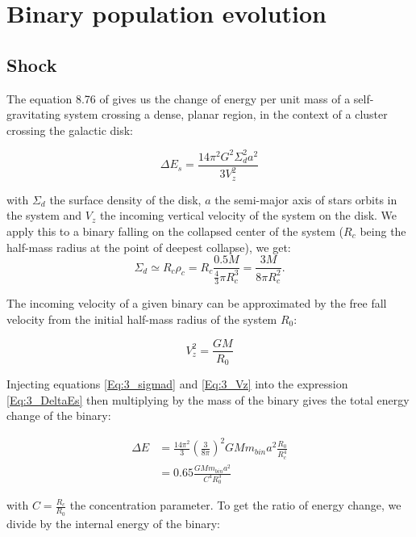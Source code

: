 
\chapter{Binary population evolution} 
\label{Chapterbinaries}

\newpage
\section{Shock}


The equation 8.76 of \cite{BT} gives us the change of energy per unit mass of a self-gravitating system crossing a dense, planar region, in the context of a cluster crossing the galactic disk:

\begin{equation}
\label{Eq:3_DeltaEs}
\Delta E_s = \frac{14 \pi^2 G^2 \Sigma^2_d a^2}{3 V_z^2}
\end{equation}

with $\Sigma_d$ the surface density of the disk, $a$ the semi-major axis of stars orbits in the system and $V_z$ the incoming vertical velocity of the system on the disk. We apply this to a binary falling on the collapsed center of the system ($R_c$ being the half-mass radius at the point of deepest collapse), we get:
\begin{equation}
\label{Eq:3_sigmad}
\Sigma_d \simeq R_c \rho_c = R_c \frac{0.5 M}{\frac{4}{3} \pi R^3_c} = \frac{3 M}{8 \pi R_c^2}.
\end{equation}

The incoming velocity of a given binary can be approximated by the free fall velocity from the initial half-mass radius of the system $R_0$:

\begin{equation}
\label{Eq:3_Vz}
V_z^2 = \frac{G M}{R_0}
\end{equation}

Injecting equations \ref{Eq:3_sigmad} and \ref{Eq:3_Vz} into the expression \ref{Eq:3_DeltaEs} then multiplying by the mass of the binary gives the total energy change of the binary:

\begin{align}
\Delta E &= \frac{14 \pi^2}{3} \left( \frac{3}{8 \pi}\right)^2 G M m_{bin} a^2 \frac{R_0}{R_c^4}\\
 &= 0.65   \frac{G M m_{bin} a^2 }{C^4 R_0^3} 
\end{align}

with $C = \frac{R_c}{R_0}$ the concentration parameter. To get the ratio of energy change, we divide by the internal energy of the binary:

